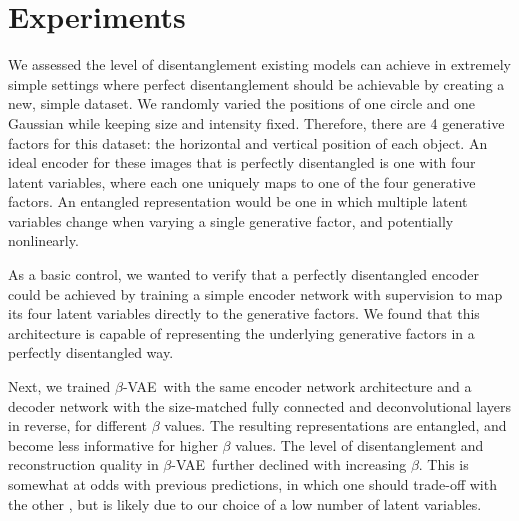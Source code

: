 \documentclass[10pt,letterpaper]{article}
\newcommand{\bvae}{$\beta$-VAE~}
\begin{document}
\section{Experiments}


We assessed the level of disentanglement existing models can achieve in extremely simple settings where perfect disentanglement should be achievable by creating a new, simple dataset. We randomly varied the positions of one circle and one Gaussian while keeping size and intensity fixed. Therefore, there are 4 generative factors for this dataset: the horizontal and vertical position of each object. An ideal encoder for these images that is perfectly disentangled is one with four latent variables, where each one uniquely maps to one of the four generative factors. An entangled representation would be one in which multiple latent variables change when varying a single generative factor, and potentially nonlinearly.

As a basic control, we wanted to verify that a perfectly disentangled encoder could be achieved by training a simple encoder network with supervision to map its four latent variables directly to the generative factors. We found that this architecture is capable of representing the underlying generative factors in a perfectly disentangled way.

Next, we trained \bvae with the same encoder network architecture and a decoder network with the size-matched fully connected and deconvolutional layers in reverse, for different $\beta$ values. The resulting representations are entangled, and become less informative for higher $\beta$ values. The level of disentanglement and reconstruction quality in \bvae further declined with increasing $\beta$. This is somewhat at odds with previous predictions, in which one should trade-off with the other \cite{Higgins2017,Alemi2017}, but is likely due to our choice of a low number of latent variables.
\end{document}
